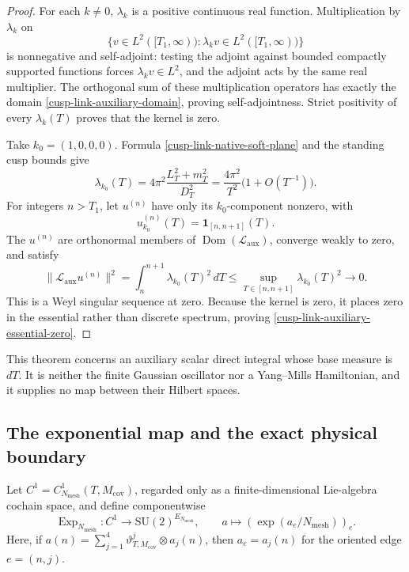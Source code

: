 \documentclass[11pt]{article}
\theoremstyle{definition}
\numberwithin{equation}{section}
\begin{document}
\begin{proof}
For each \(k\ne0\), \(\lambda_k\) is a positive continuous real function.
Multiplication by \(\lambda_k\) on
\[
 \{v\in L^2([T_1,\infty)):\lambda_kv\in L^2([T_1,\infty))\}
\]
is nonnegative and self-adjoint: testing the adjoint against bounded compactly
supported functions forces \(\lambda_kv\in L^2\), and the adjoint acts by the
same real multiplier.  The orthogonal sum of these multiplication operators
has exactly the domain \eqref{cusp-link-auxiliary-domain}, proving
self-adjointness.  Strict positivity of every \(\lambda_k(T)\) proves that the
kernel is zero.

Take \(k_0=(1,0,0,0)\).  Formula
\eqref{cusp-link-native-soft-plane} and the standing cusp bounds give
\begin{equation}
 \lambda_{k_0}(T)
 =4\pi^2\frac{L_T^2+m_T^2}{D_T^2}
 =\frac{4\pi^2}{T^2}\bigl(1+O(T^{-1})\bigr).
 \label{cusp-link-auxiliary-soft-eigenvalue}
\end{equation}
For integers \(n>T_1\), let \(u^{(n)}\) have only its \(k_0\)-component
nonzero, with
\[
 u^{(n)}_{k_0}(T)=\mathbf1_{[n,n+1]}(T).
\]
The \(u^{(n)}\) are orthonormal members of
\(\operatorname{Dom}(\mathscr L_{\mathrm{aux}})\), converge weakly to zero,
and satisfy
\[
 \|\mathscr L_{\mathrm{aux}}u^{(n)}\|^2
 =\int_n^{n+1}\lambda_{k_0}(T)^2\,dT
 \le\sup_{T\in[n,n+1]}\lambda_{k_0}(T)^2
 \longrightarrow0.
\]
This is a Weyl singular sequence at zero.  Because the kernel is zero, it
places zero in the essential rather than discrete spectrum, proving
\eqref{cusp-link-auxiliary-essential-zero}.
\end{proof}

This theorem concerns an auxiliary scalar direct integral whose base measure
is \(dT\).  It is neither the finite Gaussian oscillator nor a Yang--Mills
Hamiltonian, and it supplies no map between their Hilbert spaces.

\subsection{The exponential map and the exact physical boundary}

Let \(C^1=C^1_{N_{\mathrm{mesh}}}(T,M_{\mathrm{cov}})\), regarded only as a
finite-dimensional Lie-algebra cochain space, and define componentwise
\begin{equation}
 \operatorname{Exp}_{N_{\mathrm{mesh}}}:C^1
 \longrightarrow\mathrm{SU}(2)^{E_{N_{\mathrm{mesh}}}},
 \qquad
 a\longmapsto\left(\exp(a_e/N_{\mathrm{mesh}})\right)_e.
 \label{cusp-link-exponential-map}
\end{equation}
Here, if
\(a(n)=\sum_{j=1}^4\vartheta^j_{T,M_{\mathrm{cov}}}\otimes a_j(n)\),
then \(a_e=a_j(n)\) for the oriented edge \(e=(n,j)\).
\end{document}
